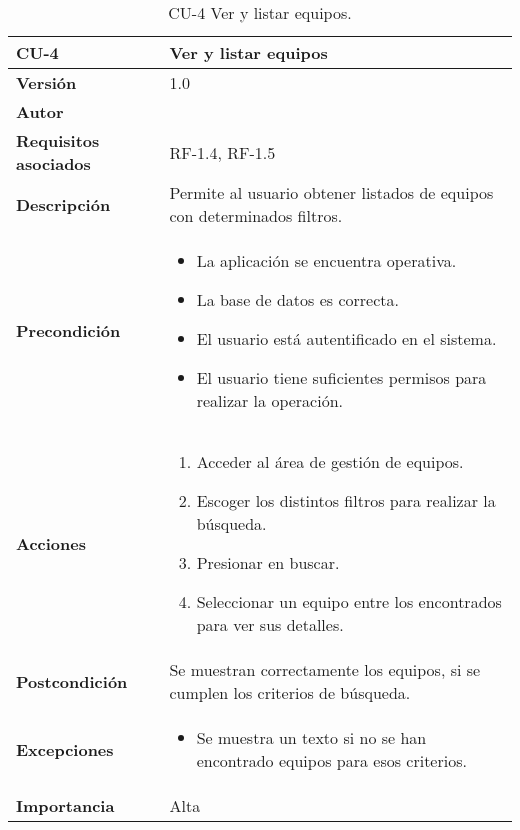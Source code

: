 \begin{table}[p]
	\centering
	\begin{tabularx}{\linewidth}{ p{} p{} }
		\toprule
		\textbf{CU-4}    & \textbf{ Ver y listar equipos}\\
		\toprule
		\textbf{Versión}              & 1.0    \\
		\textbf{Autor}                & \@author{} \\
		\textbf{Requisitos asociados} & RF-1.4, RF-1.5\\
		\textbf{Descripción}          & Permite al usuario obtener listados de equipos con determinados filtros. \\
		\textbf{Precondición}         &
		\begin{itemize}
			\tightlist
			\item La aplicación se encuentra operativa.
			\item La base de datos es correcta.
			\item El usuario está autentificado en el sistema.
			\item El usuario tiene suficientes permisos para realizar la operación.
		\end{itemize}\\
		\textbf{Acciones}             &
		\begin{enumerate}
			\tightlist
			\item Acceder al área de gestión de equipos.
			\item Escoger los distintos filtros para realizar la búsqueda.
			\item Presionar en buscar.
			\item Seleccionar un equipo entre los encontrados para ver sus detalles.
		\end{enumerate}\\
		\textbf{Postcondición}        & Se muestran correctamente los equipos, si se cumplen los criterios de búsqueda.\\
		\textbf{Excepciones}          &
		\begin{itemize}
			\tightlist
			\item Se muestra un texto si no se han encontrado equipos para esos criterios.
		\end{itemize}\\
		\textbf{Importancia}          & Alta\\
		\bottomrule
	\end{tabularx}
	\caption{CU-4 Ver y listar equipos.}\label{tab:table-4}
\end{table}

